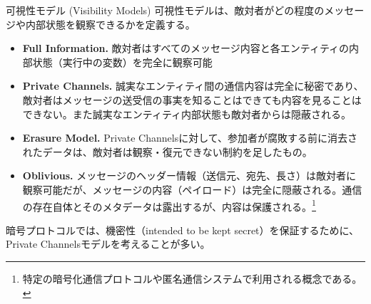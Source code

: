 \documentclass[aspectratio=169,10pt]{beamer}
\newenvironment{outlineblock}[1][]
{\begin{tcolorbox}[colframe=black, colback=white, boxrule=1pt, boxsep=5pt]}
{\end{tcolorbox}}
\begin{document}
\begin{frame}{可視性モデル (Visibility Models)}
可視性モデルは、敵対者がどの程度のメッセージや内部状態を観察できるかを定義する。

\begin{itemize}
    \item \textbf{Full Information. }敵対者はすべてのメッセージ内容と各エンティティの内部状態（実行中の変数）を完全に観察可能
    
    \item \textbf{Private Channels.} 誠実なエンティティ間の通信内容は完全に秘密であり、敵対者はメッセージの送受信の事実を知ることはできても内容を見ることはできない。また誠実なエンティティ内部状態も敵対者からは隠蔽される。
    
    \item \textbf{Erasure Model. }Private Channelsに対して、参加者が腐敗する前に消去されたデータは、敵対者は観察・復元できない制約を足したもの。
    
    \item \textbf{Oblivious.} メッセージのヘッダー情報（送信元、宛先、長さ）は敵対者に観察可能だが、メッセージの内容（ペイロード）は完全に隠蔽される。通信の存在自体とそのメタデータは露出するが、内容は保護される。\footnote{特定の暗号化通信プロトコルや匿名通信システムで利用される概念である。}
\end{itemize}

\begin{outlineblock}[]
    暗号プロトコルでは、機密性（intended to be kept secret）を保証するために、Private Channelsモデルを考えることが多い。
\end{outlineblock}

\end{frame}
\end{document}
